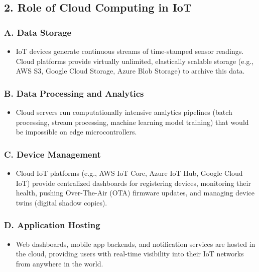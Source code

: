 \subsection{2. Role of Cloud Computing in IoT}

\subsubsection{A. Data Storage}
\begin{itemize}
  \item   IoT devices generate continuous streams of time-stamped sensor readings. Cloud platforms provide virtually unlimited, elastically scalable storage (e.g., AWS S3, Google Cloud Storage, Azure Blob Storage) to archive this data.
\end{itemize}

\subsubsection{B. Data Processing and Analytics}
\begin{itemize}
  \item   Cloud servers run computationally intensive analytics pipelines (batch processing, stream processing, machine learning model training) that would be impossible on edge microcontrollers.
\end{itemize}

\subsubsection{C. Device Management}
\begin{itemize}
  \item   Cloud IoT platforms (e.g., AWS IoT Core, Azure IoT Hub, Google Cloud IoT) provide centralized dashboards for registering devices, monitoring their health, pushing Over-The-Air (OTA) firmware updates, and managing device twins (digital shadow copies).
\end{itemize}

\subsubsection{D. Application Hosting}
\begin{itemize}
  \item   Web dashboards, mobile app backends, and notification services are hosted in the cloud, providing users with real-time visibility into their IoT networks from anywhere in the world.
\end{itemize}



